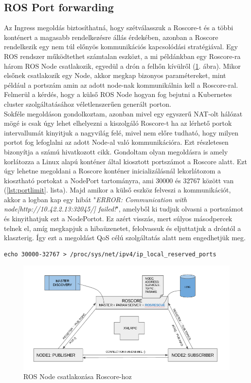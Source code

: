 \subsection{ROS Port forwarding}
Az Ingress megoldás biztosíthatná, hogy szétválasszuk a Roscore-t és a többi konténert a magasabb rendelkezésre állás érdekében, azonban a Roscore rendelkezik egy nem túl előnyös kommunikációs kapcsolódási stratégiával. Egy ROS rendszer működtethet számtalan eszközt, a mi példánkban egy Roscore-ra három ROS Node csatlakozik, egyedül a drón a felhőn kívülről (\ref{fig:rosjoin}. ábra). Mikor elsőnek csatlakozik egy Node, akkor megkap bizonyos paramétereket, mint például a portszám amin az adott node-nak kommunikálnia kell a Roscore-ral. Felmerül a kérdés, hogy a külső ROS Node hogyan fog bejutni a Kubernetes cluster szolgáltatásához véletlenszerűen generált porton. \\

\noindent
Sokféle megoldáson gondolkoztam, azonban mivel egy egyszerű NAT-olt hálózat mögé is csak úgy lehet elhelyezni a kiszolgáló Roscore-t ha az lérhető portok intervallumát kinyitjuk a nagyvilág felé, mivel nem előre tudható, hogy milyen portot fog lefoglalni az adott Node-al való kommunikációra. Ezt részletesen bizonyítja a \cite{portforward} számú hivatkozott cikk. Gondoltam olyan megoldásra is amely korlátozza a Linux alapú konténer által kiosztott portszámot a Roscore alatt. Ezt úgy lehetne megoldani a Roscore konténer inicializálásnál lekorlátozom a kiosztható portokat a NodePort tartományra, ami 30000 és 32767 között van (\ref{lst:portlimit}. lista). Majd amikor a külső eszköz felveszi a kommunikációt, akkor a logban kap egy hibát "\emph{ERROR: Communication with node[http://10.42.2.13:32045/] failed!}", amelyből ki tudjuk olvasni a portszámot és kinyithatjuk ezt a NodePortot. Ez azért visszás, mert súlyos másodpercek telnek el, amíg megkapjuk a hibaüzenetet, felolvassuk és eljuttatjuk a dróntól a klaszterig. Így ezt a megoldást QoS célú szolgáltatás alatt nem engedhetjük meg.

\begin{lstlisting}[caption={Linuxon kiosztható port korlátozása}, label={lst:portlimit}]
echo 30000-32767 > /proc/sys/net/ipv4/ip_local_reserved_ports
\end{lstlisting}

\begin{figure}
	\centering
	\includegraphics[width=\linewidth]{figures/rosjoin.png}
	\caption{ROS Node csatlakozása Roscore-hoz \cite{rosjoin}}
	\label{fig:rosjoin}
\end{figure}

